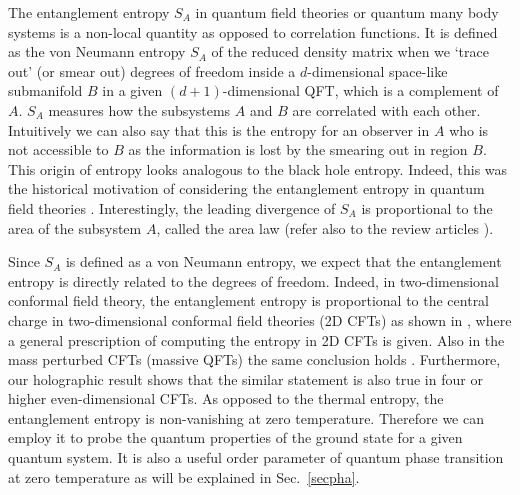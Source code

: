 \documentclass[12pt]{article}
\begin{document}
The entanglement entropy $S_A$ in quantum field theories or quantum many body systems is a non-local
quantity as opposed to
correlation functions. It is defined
as the von Neumann entropy $S_A$ of the reduced density matrix
when we `trace out' (or smear out)
degrees of freedom inside a $d$-dimensional space-like submanifold
$B$ in a given $(d+1)$-dimensional QFT, which is a complement of $A$.
$S_A$ measures how the subsystems $A$ and $B$ are correlated with each other.
Intuitively we can also say that
this is the entropy for an observer in $A$ who is not accessible to
$B$ as the information is lost by the smearing out in region $B$.
This origin of entropy looks analogous to the black hole entropy.
Indeed, this was the historical motivation of considering the entanglement
entropy in quantum field theories \cite{Thooft,Bombelli,Srednicki}.
Interestingly, the leading divergence of $S_A$ is proportional
to the area of the subsystem $A$, called the area law
\cite{Bombelli,Srednicki} (refer also
to the review articles
\cite{Calabrese:2005zw,Riera:2006vj,Latorre:2006py,Amico,ECP,Casini:2009sr,CReview,LatR}).

Since $S_A$ is defined as a von Neumann entropy,
 we expect that the entanglement entropy is
directly related to the degrees of freedom. Indeed, in two-dimensional
conformal field theory, the entanglement
entropy is proportional to the central charge in two-dimensional
conformal field theories (2D CFTs) as shown in
\cite{HLW, Cardy}, where a general prescription of computing the
entropy in 2D CFTs is given.
 Also in the mass perturbed CFTs (massive QFTs) the same
conclusion holds \cite{Vidal03, Latorre04, Cardy}. Furthermore,
our holographic result shows that the similar statement is also true in
four or higher even-dimensional CFTs. As opposed to the thermal entropy,
the entanglement entropy is non-vanishing at zero temperature.
Therefore we can employ it to probe the quantum properties of the
ground state for a given quantum system. It is also a useful order parameter
of quantum phase transition at zero temperature as will be explained in
 Sec.\ \ref{secpha}.
\end{document}
